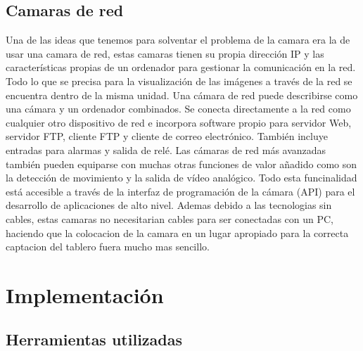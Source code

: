 \documentclass[12pt,a4paper]{report}
\begin{document}
\section{Camaras de red}

Una de las ideas que tenemos para solventar el problema de la camara era la de usar una camara de red, estas camaras tienen su propia dirección IP y las características
propias de un ordenador para gestionar la comunicación en la red.
Todo lo que se precisa para la visualización de las imágenes a través
de la red se encuentra dentro de la misma unidad.
Una cámara de red puede describirse como una cámara y un
ordenador combinados. Se conecta directamente a la red como
cualquier otro dispositivo de red e incorpora software propio para
servidor Web, servidor FTP, cliente FTP y cliente de correo electrónico.
También incluye entradas para alarmas y salida de relé.
Las cámaras de red más avanzadas también pueden equiparse con
muchas otras funciones de valor añadido como son la detección de
movimiento y la salida de vídeo analógico.
Todo esta funcinalidad está accesible a través de la interfaz de
programación de la cámara (API) para el desarrollo de aplicaciones de
alto nivel.
Ademas debido a las tecnologias sin cables, estas camaras no necesitarian cables para ser conectadas con un PC, haciendo que la colocacion de la camara en un lugar apropiado para la correcta captacion del tablero fuera mucho mas sencillo.

\chapter{Implementación}

\section{Herramientas utilizadas}
\end{document}

